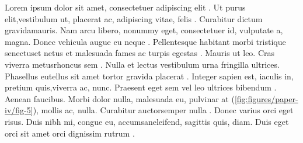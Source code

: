 \begin{sloppypar} %

Lorem  ipsum dolor sit amet, consectetuer adipiscing elit \cite{LIUDIMULYO201767}. Ut purus  elit,vestibulum ut, placerat ac, adipiscing vitae, felis . Curabitur dictum  gravidamauris. Nam arcu libero, nonummy eget, consectetuer id, vulputate a, magna. Donec vehicula augue eu neque \cite{liudimulyo_2018}. Pellentesque habitant morbi tristique senectuset netus et malesuada fames ac turpis egestas . Mauris ut leo. Cras viverra metusrhoncus sem \cite{2019liudimulyo}. Nulla et lectus vestibulum urna fringilla ultrices. Phasellus eutellus sit amet tortor gravida placerat . Integer sapien est, iaculis in, pretium quis,viverra ac, nunc. Praesent eget sem vel leo ultrices bibendum \cite{liudimulyo2020853}. Aenean faucibus. Morbi dolor nulla, malesuada eu, pulvinar at (\ref{fig:figures/paper-iv/fig-5}), mollis ac, nulla. Curabitur auctorsemper nulla . Donec varius orci eget risus. Duis nibh mi, congue eu, accumsaneleifend, sagittis quis, diam. Duis eget orci sit amet orci dignissim rutrum \cite{LIUDIMULYO201767,liudimulyo_2018,2019liudimulyo,liudimulyo2020853,liudimulyo_unpublished1,liudimulyo_unpublished2}.

\end{sloppypar}

